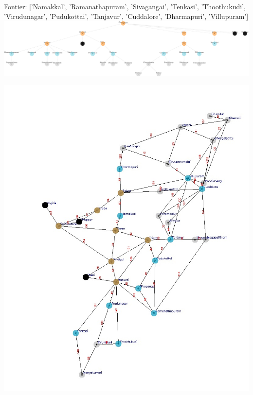 \documentclass[xcolor=table]{beamer}
\begin{document}
\begin{frame}
  { \tiny Fontier: ['Namakkal', 'Ramanathapuram', 'Sivagangai', 'Tenkasi', 'Thoothukudi', 'Virudunagar', 'Pudukottai', 'Tanjavur', 'Cuddalore', 'Dharmapuri', 'Villupuram'] }
  \includegraphics[width=1\textwidth]{../BFSNodes/15-1.png}
  \begin{center}
    \includegraphics[height=0.55\textheight]{../BFSoutput/tamilBFS13.jpg}
  \end{center}
\end{frame}
\end{document}
